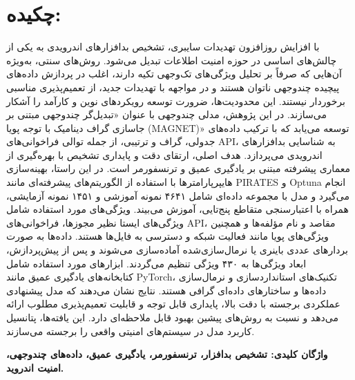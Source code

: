 \chapter*{\vspace{-2.38cm}\fontsize{15}{16}\selectfont چکیده:}
\vspace{-1.5cm}\setlength{\parindent}{20pt}
با افزایش روزافزون تهدیدات سایبری، تشخیص بدافزارهای اندرویدی به یکی از چالش‌های اساسی در حوزه امنیت اطلاعات تبدیل می‌شود. روش‌های سنتی، به‌ویژه آن‌هایی که صرفاً بر تحلیل ویژگی‌های تک‌وجهی تکیه دارند، اغلب در پردازش داده‌های پیچیده چندوجهی ناتوان هستند و در مواجهه با تهدیدات جدید، از تعمیم‌پذیری مناسبی برخوردار نیستند. این محدودیت‌ها، ضرورت توسعه رویکردهای نوین و کارآمد را آشکار می‌سازند. در این پژوهش، مدلی چندوجهی با عنوان «تبدیل‌گر چندوجهی مبتنی بر جاسازی گراف دینامیک با توجه پویا (MAGNET)» توسعه می‌یابد که با ترکیب داده‌های جدولی، گراف و ترتیبی، از جمله توالی فراخوانی‌های API، به شناسایی بدافزارهای اندرویدی می‌پردازد. هدف اصلی، ارتقای دقت و پایداری تشخیص با بهره‌گیری از معماری پیشرفته مبتنی بر یادگیری عمیق و ترنسفورمر است. در این راستا، بهینه‌سازی هایپرپارامترها با استفاده از الگوریتم‌های پیشرفته‌ای مانند PIRATES و Optuna انجام می‌گیرد و مدل با مجموعه داده‌ای شامل ۴۶۴۱ نمونه آموزشی و ۱۴۵۱ نمونه آزمایشی، همراه با اعتبارسنجی متقاطع پنج‌تایی، آموزش می‌بیند. ویژگی‌های مورد استفاده شامل ویژگی‌های ایستا نظیر مجوزها، فراخوانی‌های API، مقاصد و نام مؤلفه‌ها و همچنین ویژگی‌های پویا مانند فعالیت شبکه و دسترسی به فایل‌ها هستند. داده‌ها به صورت بردارهای عددی باینری یا نرمال‌سازی‌شده آماده‌سازی می‌شوند و پس از پیش‌پردازش، ابعاد ویژگی‌ها به ۴۳۰ ویژگی تنظیم می‌گردند. ابزارهای مورد استفاده شامل کتابخانه‌های یادگیری عمیق مانند PyTorch، تکنیک‌های استانداردسازی و نرمال‌سازی داده‌ها و ساختارهای داده‌ای گرافی هستند. نتایج نشان می‌دهند که مدل پیشنهادی عملکردی برجسته با دقت بالا، پایداری قابل توجه و قابلیت تعمیم‌پذیری مطلوب ارائه می‌دهد و نسبت به روش‌های پیشین بهبود قابل ملاحظه‌ای دارد. این یافته‌ها، پتانسیل کاربرد مدل در سیستم‌های امنیتی واقعی را برجسته می‌سازند.

\par\vspace{.5cm}\setlength{\parindent}{0pt}
{\bf
واژگان کلیدی: تشخیص بدافزار، ترنسفورمر، یادگیری عمیق، داده‌های چندوجهی، امنیت اندروید.
}
